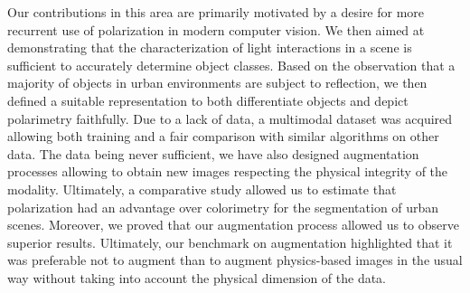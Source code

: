 Our contributions in this area are primarily motivated by a desire for more recurrent use of polarization in modern computer vision. We then aimed at demonstrating that the characterization of light interactions in a scene is sufficient to accurately determine object classes. Based on the observation that a majority of objects in urban environments are subject to reflection, we then defined a suitable representation to both differentiate objects and depict polarimetry faithfully. 
Due to a lack of data, a multimodal dataset was acquired allowing both training and a fair comparison with similar algorithms on other data. The data being never sufficient, we have also designed augmentation processes allowing to obtain new images respecting the physical integrity of the modality.
Ultimately, a comparative study allowed us to estimate that polarization had an advantage over colorimetry for the segmentation of urban scenes. Moreover, we proved that our augmentation process allowed us to observe superior results. Ultimately, our benchmark on augmentation highlighted that it was preferable not to augment than to augment physics-based images in the usual way without taking into account the physical dimension of the data.\\

